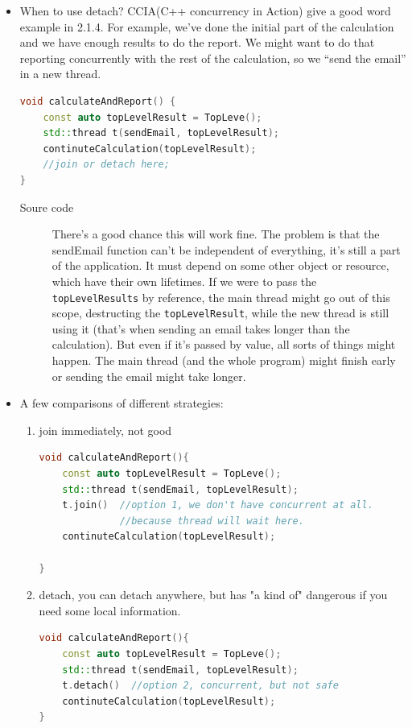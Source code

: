 \documentclass[a4paper,11pt,twoside]{book}
\begin{document}
\begin{itemize}

	\item When to use detach? CCIA(C++ concurrency in Action) give a good word example in 2.1.4. For example, we’ve done the initial part of the calculation and we have enough results to do the report. We might want to do that reporting concurrently with the rest of the calculation, so we “send the email” in a new thread.

\begin{lstlisting}[frame=single, language=c++]
void calculateAndReport() {
	const auto topLevelResult = TopLeve();
	std::thread t(sendEmail, topLevelResult);
	continuteCalculation(topLevelResult);
	//join or detach here;
}
\end{lstlisting}	

\begin{description}
	\item[Soure code]  There’s a good chance this will work fine. The problem is that the sendEmail function can’t be independent of everything, it’s still a part of the application. It must depend on some other object or resource, which have their own lifetimes. If we were to pass the \texttt{topLevelResults} by reference, the main thread might go out of this scope, destructing the \texttt{topLevelResult}, while the new thread is still using it (that’s when sending an email takes longer than the calculation). But even if it’s passed by value, all sorts of things might happen. The main thread (and the whole program) might finish early or sending the email might take longer.
\end{description}

	\item A few comparisons of different strategies:
	\begin{enumerate}
		\item join immediately, not good
\begin{lstlisting}[frame=single, language=c++]
void calculateAndReport(){
	const auto topLevelResult = TopLeve();
	std::thread t(sendEmail, topLevelResult);
	t.join()  //option 1, we don't have concurrent at all. 
	          //because thread will wait here.
	continuteCalculation(topLevelResult);
	
}		
\end{lstlisting}	
		\item detach, you can detach anywhere, but has "a kind of" dangerous if you need some local information. 
\begin{lstlisting}[frame=single, language=c++]
void calculateAndReport(){
	const auto topLevelResult = TopLeve();
	std::thread t(sendEmail, topLevelResult);
	t.detach()  //option 2, concurrent, but not safe 
	continuteCalculation(topLevelResult);
}			
\end{lstlisting}


\end{enumerate}
\end{itemize}
\end{document}
